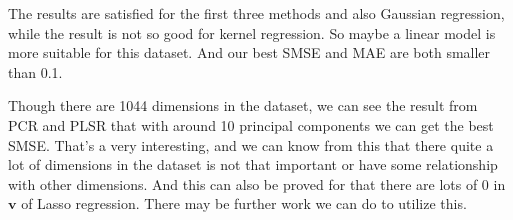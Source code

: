 \documentclass[a4paper]{article}
\newcommand{\bfv}{\mathbf{v}}
\begin{document}
The results are satisfied for the first three methods and also Gaussian regression, while the result is not so good for kernel regression. So maybe a linear model is more suitable for this dataset. And our best SMSE and MAE are both smaller than 0.1.

Though there are 1044 dimensions in the dataset, we can see the result from PCR and PLSR that with around 10 principal components we can get the best SMSE. That's a very interesting, and we can know from this that there quite a lot of dimensions in the dataset is not that important or have some relationship with other dimensions. And this can also be proved for that there are lots of 0 in $\bfv$ of Lasso regression. There may be further work we can do to utilize this.


\end{document}
